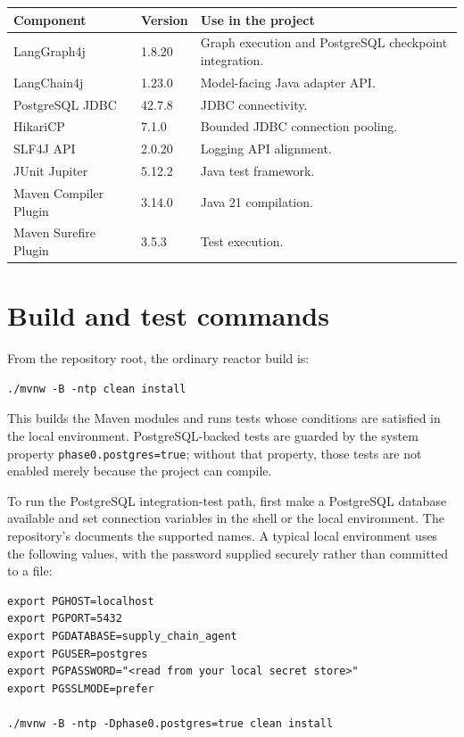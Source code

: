 \begin{center}
\small
\begin{tabularx}{\linewidth}{P{0.43\textwidth} P{0.20\textwidth} X}
\toprule
\textbf{Component} & \textbf{Version} & \textbf{Use in the project} \\
\midrule
LangGraph4j & 1.8.20 & Graph execution and PostgreSQL checkpoint integration. \\
LangChain4j & 1.23.0 & Model-facing Java adapter API. \\
PostgreSQL JDBC & 42.7.8 & JDBC connectivity. \\
HikariCP & 7.1.0 & Bounded JDBC connection pooling. \\
SLF4J API & 2.0.20 & Logging API alignment. \\
JUnit Jupiter & 5.12.2 & Java test framework. \\
Maven Compiler Plugin & 3.14.0 & Java 21 compilation. \\
Maven Surefire Plugin & 3.5.3 & Test execution. \\
\bottomrule
\end{tabularx}
\end{center}

\section{Build and test commands}

From the repository root, the ordinary reactor build is:

\begin{lstlisting}[basicstyle=\ttfamily\small]
./mvnw -B -ntp clean install
\end{lstlisting}

This builds the Maven modules and runs tests whose conditions are satisfied in the local environment. PostgreSQL-backed tests are guarded by the system property \texttt{phase0.postgres=true}; without that property, those tests are not enabled merely because the project can compile.

To run the PostgreSQL integration-test path, first make a PostgreSQL database available and set connection variables in the shell or the local environment. The repository's  documents the supported names. A typical local environment uses the following values, with the password supplied securely rather than committed to a file:

\begin{lstlisting}[basicstyle=\ttfamily\small]
export PGHOST=localhost
export PGPORT=5432
export PGDATABASE=supply_chain_agent
export PGUSER=postgres
export PGPASSWORD="<read from your local secret store>"
export PGSSLMODE=prefer

./mvnw -B -ntp -Dphase0.postgres=true clean install
\end{lstlisting}

